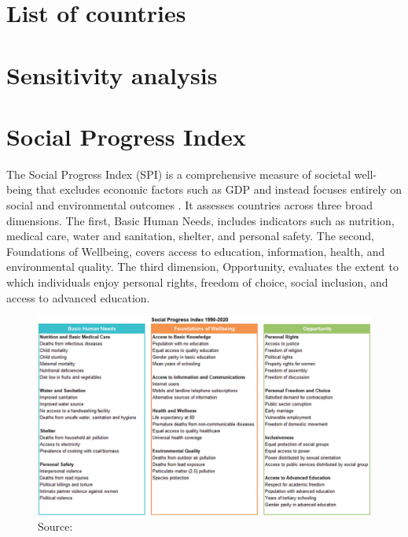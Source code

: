 \begin{appendices}
	\renewcommand{\thesection}{Appendix \arabic{section}}

\small
\newpage
\section{List of countries} \label{app:list}

\newpage
\section{Sensitivity analysis} \label{app:sensitive}

\newpage
\section{Social Progress Index} \label{app:spi}

The Social Progress Index (SPI) is a comprehensive measure of societal well-being that excludes economic factors such as GDP and instead focuses entirely on social and environmental outcomes \citep{krylova2025social}. It assesses countries across three broad dimensions. The first, Basic Human Needs, includes indicators such as nutrition, medical care, water and sanitation, shelter, and personal safety. The second, Foundations of Wellbeing, covers access to education, information, health, and environmental quality. The third dimension, Opportunity, evaluates the extent to which individuals enjoy personal rights, freedom of choice, social inclusion, and access to advanced education.

\begin{figure}[h!]
	\centering
	\includegraphics[width=1\linewidth]{figs/SPI.jpg}
	Source: \citet{krylova2025social}
\end{figure}

\end{appendices}
